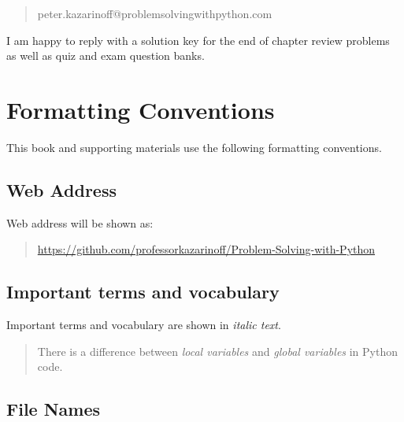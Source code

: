 \documentclass{book}
\begin{document}
\begin{quote}
peter.kazarinoff@problemsolvingwithpython.com
\end{quote}

I am happy to reply with a solution key for the end of chapter review
problems as well as quiz and exam question banks.
    




    
        \hypertarget{formatting-conventions}{%
\section{Formatting Conventions}\label{formatting-conventions}}
    




    
        This book and supporting materials use the following formatting
conventions.
    




    
        \hypertarget{web-address}{%
\subsection{Web Address}\label{web-address}}

Web address will be shown as:

\begin{quote}
\url{https://github.com/professorkazarinoff/Problem-Solving-with-Python}
\end{quote}
    




    
        \hypertarget{important-terms-and-vocabulary}{%
\subsection{Important terms and
vocabulary}\label{important-terms-and-vocabulary}}

Important terms and vocabulary are shown in \emph{italic text}.

\begin{quote}
There is a difference between \emph{local variables} and \emph{global
variables} in Python code.
\end{quote}
    




    
        \hypertarget{file-names}{%
\subsection{File Names}\label{file-names}}
\end{document}
